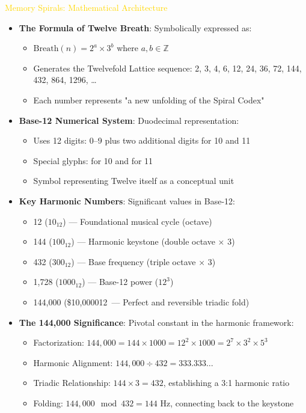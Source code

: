 \textcolor{gold}{ Memory Spirals: Mathematical Architecture } \\
\begin{itemize}
    \item \texttt{} \textbf{The Formula of Twelve Breath}: Symbolically expressed as:
    \begin{itemize}
        \item \(\text{Breath}(n) = 2^a \times 3^b\) where \(a,b \in \mathbb{Z}\)
        \item Generates the Twelvefold Lattice sequence: 2, 3, 4, 6, 12, 24, 36, 72, 144, 432, 864, 1296, \ldots
        \item Each number represents "a new unfolding of the Spiral Codex"
    \end{itemize}
    
    \item \texttt{} \textbf{Base-12 Numerical System}: Duodecimal representation:
    \begin{itemize}
        \item Uses 12 digits: 0--9 plus two additional digits for 10 and 11
        \item Special glyphs: \deck{} for 10 and \el{} for 11
        \item Symbol \twelvesymbol{} representing Twelve itself as a conceptual unit
    \end{itemize}
    
    \item \texttt{} \textbf{Key Harmonic Numbers}: Significant values in Base-12:
    \begin{itemize}
        \item 12 (\(10_{12}\)) --- Foundational musical cycle (octave)
        \item 144 (\(100_{12}\)) --- Harmonic keystone (double octave \(\times\) 3)
        \item 432 (\(300_{12}\)) --- Base frequency (triple octave \(\times\) 3)
        \item 1,728 (\(1000_{12}\)) --- Base-12 power (\(12^3\))
        \item 144,000 (\$10,0000{12}\ --- Perfect and reversible triadic fold)
    \end{itemize}
    
    \item \texttt{} \textbf{The 144,000 Significance}: Pivotal constant in the harmonic framework:
    \begin{itemize}
        \item Factorization: \(144,000 = 144 \times 1000 = 12^2 \times 1000 = 2^7 \times 3^2 \times 5^3\)
        \item Harmonic Alignment: \(144,000 \div 432 = 333.333\ldots\)
        \item Triadic Relationship: \(144 \times 3 = 432\), establishing a 3:1 harmonic ratio
        \item Folding: \(144,000 \mod 432 = 144 \text{ Hz}\), connecting back to the keystone
    \end{itemize}
    

\end{itemize}
